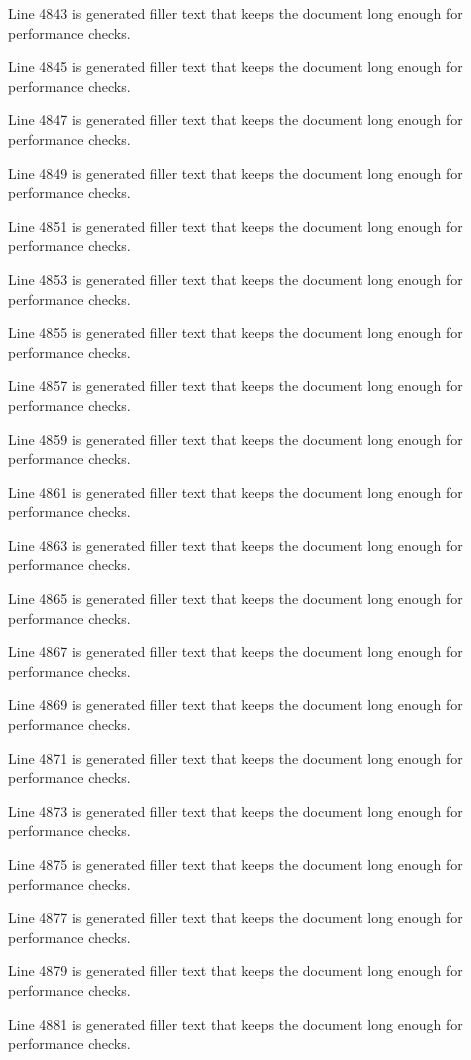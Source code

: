 Line 4843 is generated filler text that keeps the document long enough for performance checks.

Line 4845 is generated filler text that keeps the document long enough for performance checks.

Line 4847 is generated filler text that keeps the document long enough for performance checks.

Line 4849 is generated filler text that keeps the document long enough for performance checks.

Line 4851 is generated filler text that keeps the document long enough for performance checks.

Line 4853 is generated filler text that keeps the document long enough for performance checks.

Line 4855 is generated filler text that keeps the document long enough for performance checks.

Line 4857 is generated filler text that keeps the document long enough for performance checks.

Line 4859 is generated filler text that keeps the document long enough for performance checks.

Line 4861 is generated filler text that keeps the document long enough for performance checks.

Line 4863 is generated filler text that keeps the document long enough for performance checks.

Line 4865 is generated filler text that keeps the document long enough for performance checks.

Line 4867 is generated filler text that keeps the document long enough for performance checks.

Line 4869 is generated filler text that keeps the document long enough for performance checks.

Line 4871 is generated filler text that keeps the document long enough for performance checks.

Line 4873 is generated filler text that keeps the document long enough for performance checks.

Line 4875 is generated filler text that keeps the document long enough for performance checks.

Line 4877 is generated filler text that keeps the document long enough for performance checks.

Line 4879 is generated filler text that keeps the document long enough for performance checks.

Line 4881 is generated filler text that keeps the document long enough for performance checks.

